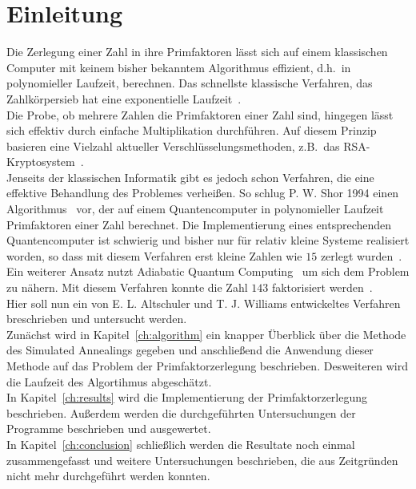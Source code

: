 \chapter{Einleitung}
Die Zerlegung einer Zahl in ihre Primfaktoren lässt sich auf einem klassischen Computer mit keinem bisher bekanntem Algorithmus effizient, d.h.\ in polynomieller Laufzeit, berechnen. Das schnellste klassische Verfahren, das Zahlkörpersieb hat eine exponentielle Laufzeit~\parencite{pomerance}.\\
Die Probe, ob mehrere Zahlen die Primfaktoren einer Zahl sind, hingegen lässt sich effektiv durch einfache Multiplikation durchführen. Auf diesem Prinzip basieren eine Vielzahl aktueller Verschlüsselungsmethoden, z.B.\ das RSA-Kryptosystem~\parencite{rsa}. \\
Jenseits der klassischen Informatik gibt es jedoch schon Verfahren, die eine effektive Behandlung des Problemes verheißen. So schlug P. W. Shor 1994 einen Algorithmus~\parencite{shor} vor, der auf einem Quantencomputer in polynomieller Laufzeit Primfaktoren einer Zahl berechnet. Die Implementierung eines entsprechenden Quantencomputer ist schwierig und bisher nur für relativ kleine Systeme realisiert worden, so dass mit diesem Verfahren erst kleine Zahlen wie $15$ zerlegt wurden~\parencite{vandersypen}.\\
Ein weiterer Ansatz nutzt Adiabatic Quantum Computing~\parencite{suter} um sich dem Problem zu nähern. Mit diesem Verfahren konnte die Zahl $143$ faktorisiert werden~\parencite{xu}. \\
Hier soll nun ein von E. L. Altschuler und T. J. Williams entwickeltes Verfahren~\parencite{altschuler} breschrieben und untersucht werden.\\
Zunächst wird in Kapitel~\ref{ch:algorithm} ein knapper Überblick über die Methode des Simulated Annealings gegeben und anschließend die Anwendung dieser Methode auf das Problem der Primfaktorzerlegung beschrieben. Desweiteren wird die Laufzeit des Algortihmus abgeschätzt.\\
In Kapitel~\ref{ch:results} wird die Implementierung der Primfaktorzerlegung beschrieben. Außerdem werden die durchgeführten Untersuchungen der Programme beschrieben und ausgewertet.\\
In Kapitel~\ref{ch:conclusion} schließlich werden die Resultate noch einmal zusammengefasst und weitere Untersuchungen beschrieben, die aus Zeitgründen nicht mehr durchgeführt werden konnten.

